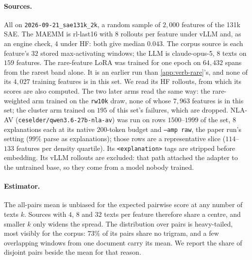 \paragraph{Sources.} All on \texttt{2026-09-21\_sae131k\_2k}, a random sample of $2{,}000$ features
of the 131k SAE. The MAEMM is rl-last16 with $8$ rollouts per feature under vLLM and, as an engine
check, $4$ under HF: both give median $0.043$. The corpus source is each feature's $32$ stored
max-activating windows; the LLM is claude-opus-5, $8$ texts on $159$ features. The rare-feature LoRA
was trained for one epoch on $64{,}432$ spans from the rarest band alone. It is an earlier run than
\cref{app:verb-rare}'s, and none of its $4{,}027$ training features is in this set. We read its HF
rollouts, from which its scores are also computed. The two later arms read the same way: the
rare-weighted arm trained on the \texttt{rw10k} draw, none of whose $7{,}963$ features is in this
set; the cluster arm trained on $195$ of this set's failures, which are dropped. NLA-AV
(\texttt{ceselder/qwen3.6-27b-nla-av}) was run on rows $1500$--$1999$ of the set, $8$ explanations
each at its native $200$-token budget and \texttt{--amp raw}, the paper run's setting ($99\%$ parse
as explanations); those rows are a representative slice ($114$--$133$ features per density
quartile). Its \texttt{<explanation>} tags are stripped before embedding. Its vLLM rollouts are excluded: that path attached
the adapter to the untrained base, so they come from a model nobody trained.

\paragraph{Estimator.} The all-pairs mean is unbiased for the expected pairwise score at any number
of texts $k$. Sources with $4$, $8$ and $32$ texts per feature therefore share a centre, and smaller
$k$ only widens the spread. The distribution over pairs is heavy-tailed, most visibly for the corpus:
$73\%$ of its pairs share no trigram, and a few overlapping windows from one document carry its
mean. We report the share of disjoint pairs beside the mean for that reason.

